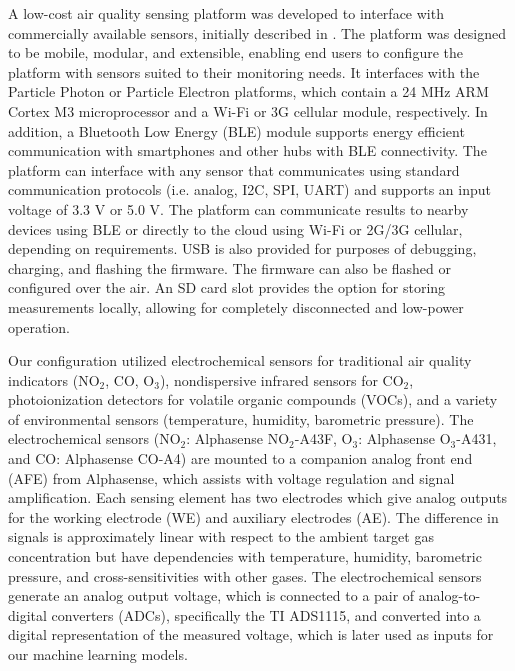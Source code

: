 \documentclass[journal abbreviation, manuscript]{copernicus}
\newcommand{\textus}[1]{$_{\text{#1}}$}
\begin{document}
A low-cost air quality sensing platform was developed to interface with commercially available sensors, initially described in \citet{Chan2017context}. The platform was designed to be mobile, modular, and extensible, enabling end users to configure the platform with sensors suited to their monitoring needs. It interfaces with the Particle Photon or Particle Electron platforms, which contain a 24 MHz ARM Cortex M3 microprocessor and a Wi-Fi or 3G cellular module, respectively. In addition, a Bluetooth Low Energy (BLE) module supports energy efficient communication with smartphones and other hubs with BLE connectivity. The platform can interface with any sensor that communicates using standard communication protocols (i.e. analog, I2C, SPI, UART) and supports an input voltage of 3.3 V or 5.0 V. The platform can communicate results to nearby devices using BLE or directly to the cloud using Wi-Fi or 2G/3G cellular, depending on requirements.  USB is also provided for purposes of debugging, charging, and flashing the firmware.  The firmware can also be flashed or configured over the air. An SD card slot provides the option for storing measurements locally, allowing for completely disconnected and low-power operation.

Our configuration utilized electrochemical sensors for traditional air quality indicators (NO\textus{2}, CO, O\textus{3}), nondispersive infrared sensors for CO\textus{2}, photoionization detectors for volatile organic compounds (VOCs), and a variety of environmental sensors (temperature, humidity, barometric pressure). The electrochemical sensors (NO\textus{2}: Alphasense NO\textus{2}-A43F, O\textus{3}: Alphasense O\textus{3}-A431, and CO: Alphasense CO-A4) are mounted to a companion analog front end (AFE) from Alphasense, which assists with voltage regulation and signal amplification. Each sensing element has two electrodes which give analog outputs for the working electrode (WE) and auxiliary electrodes (AE). The difference in signals is approximately linear with respect to the ambient target gas concentration but have dependencies with temperature, humidity, barometric pressure, and cross-sensitivities with other gases. The electrochemical sensors generate an analog output voltage, which is connected to a pair of analog-to-digital converters (ADCs), specifically the TI ADS1115, and converted into a digital representation of the measured voltage, which is later used as inputs for our machine learning models.

\end{document}
